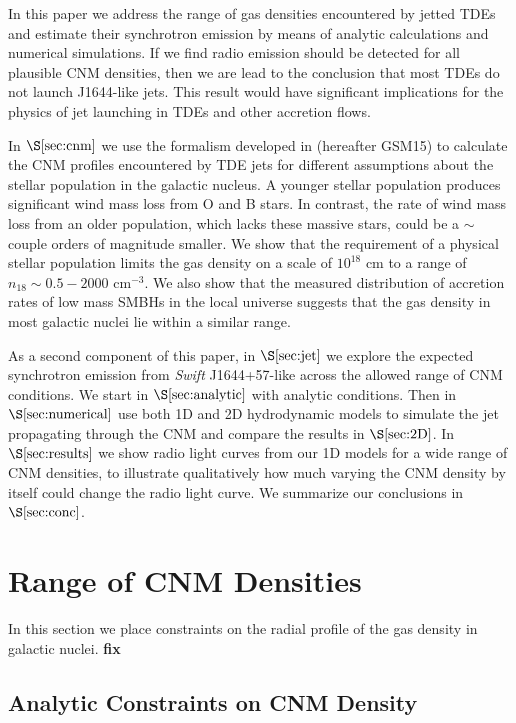 \documentclass[usenatbib,fleqn]{mnras}
\begin{document}
In this paper we address the range of gas densities encountered by
jetted TDEs and estimate their synchrotron emission by means of
analytic calculations and numerical simulations.  If we find radio
emission should be detected for all plausible CNM densities, then we
are lead to the conclusion that most TDEs do not launch J1644-like
jets.  This result would have significant implications for the physics
of jet launching in TDEs and other accretion flows. 

In $\S\ref{sec:cnm}$ we use the formalism developed in
\citet{Generozov+2015} (hereafter GSM15) to calculate the CNM profiles
encountered by TDE jets for different assumptions about the stellar
population in the galactic nucleus.  A younger stellar population
produces significant wind mass loss from O and B stars. In contrast,
the rate of wind mass loss from an older population, which lacks these
massive stars, could be a $\sim$couple orders of magnitude smaller.
We show that the requirement of a physical stellar population limits
the gas density on a scale of $10^{18}$ cm to a range of $n_{18} \sim
0.5-2000$ cm$^{-3}$. We also show that the measured distribution of
accretion rates of low mass SMBHs in the local universe suggests that
the gas density in most galactic nuclei lie within a similar range.

As a second component of this paper, in $\S\ref{sec:jet}$ we explore
the expected synchrotron emission from {\it Swift} J1644+57-like
across the allowed range of CNM conditions.  We start in
$\S\ref{sec:analytic}$ with analytic conditions.  Then in
$\S\ref{sec:numerical}$ use both 1D and 2D hydrodynamic models to
simulate the jet propagating through the CNM and compare the results
in $\S\ref{sec:2D}$. In $\S\ref{sec:results}$ we show radio light
curves from our 1D models for a wide range of CNM densities, to
illustrate qualitatively how much varying the CNM density by itself
could change the radio light curve.  We summarize our conclusions in
$\S\ref{sec:conc}$.

\section{Range of CNM Densities}
\label{sec:cnm}

In this section we place constraints on the radial profile of the gas
density in galactic nuclei. {\bf fix}

\subsection{Analytic Constraints on CNM Density}
\end{document}
